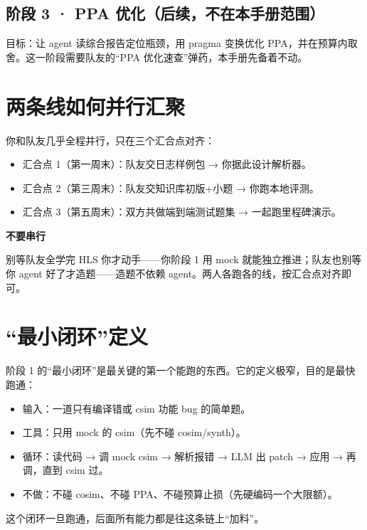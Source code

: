\documentclass[12pt,a4paper]{ctexbook}
\begin{document}
\subsection*{阶段 3 · PPA 优化（后续，不在本手册范围）}

目标：让 agent 读综合报告定位瓶颈，用 pragma 变换优化 PPA，并在预算内取舍。这一阶段需要队友的“PPA 优化速查”弹药，本手册先备着不动。

\section{两条线如何并行汇聚}

你和队友几乎全程并行，只在三个汇合点对齐：

\begin{itemize}
\item 汇合点 1（第一周末）：队友交日志样例包 → 你据此设计解析器。
\item 汇合点 2（第三周末）：队友交知识库初版+小题 → 你跑本地评测。
\item 汇合点 3（第五周末）：双方共做端到端测试题集 → 一起跑里程碑演示。
\end{itemize}

\begin{warnbox}
\textbf{不要串行}\par
别等队友全学完 HLS 你才动手——你阶段 1 用 mock 就能独立推进；队友也别等你 agent 好了才造题——造题不依赖 agent。两人各跑各的线，按汇合点对齐即可。
\end{warnbox}

\section{“最小闭环”定义}

阶段 1 的“最小闭环”是最关键的第一个能跑的东西。它的定义极窄，目的是最快跑通：

\begin{itemize}
\item 输入：一道只有编译错或 csim 功能 bug 的简单题。
\item 工具：只用 mock 的 csim（先不碰 cosim/synth）。
\item 循环：读代码 → 调 mock csim → 解析报错 → LLM 出 patch → 应用 → 再调，直到 csim 过。
\item 不做：不碰 cosim、不碰 PPA、不碰预算止损（先硬编码一个大限额）。
\end{itemize}

这个闭环一旦跑通，后面所有能力都是往这条链上“加料”。

\end{document}
